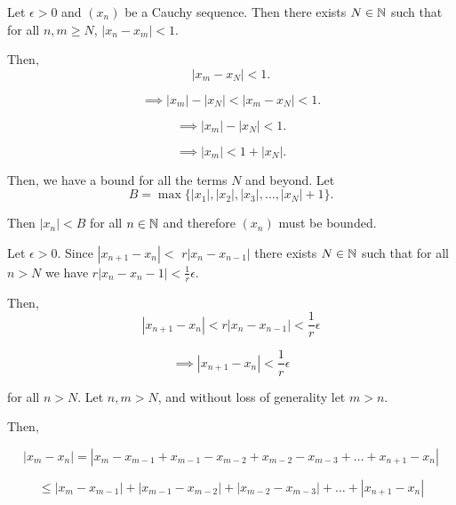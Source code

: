 \documentclass{report}
\begin{document}
\bigskip
{}

\bigskip
\bigskip
{}

Let $\epsilon >0$ and $(x_n)$ be a Cauchy sequence. Then there exists $N \in \NN$ such that for all $n,m \geq N$, $\left| x_n - x_m\right| < 1.$ 

Then, 
 $$ \left|x_m - x_N\right| < 1.$$

$$ \implies \left| x_m \right| - \left|x_N\right| < \left| x_m - x_N\right| < 1.$$


$$ \implies \left| x_m \right| - \left|x_N\right|  < 1.$$

$$ \implies \left| x_m \right| < 1 + \left|x_N\right|.$$


Then, we have a bound for all the terms $N$ and beyond. Let $$ B = \max\{|x_1|, |x_2|, |x_3|, \dots, |x_N| + 1\}.$$

Then $|x_n| < B$ for all $n \in \NN$ and therefore $(x_n)$ must be bounded.

\bigskip


Let $\epsilon >0.$ Since $\left|x_{n+1}-x_n\right|<$ $r\left|x_n-x_{n-1}\right|$ there exists $N \in \NN$ such that for all $n> N$ we have $r|x_n - x_n-1| < \frac{1}{r}\epsilon.$

Then, $$\left|x_{n+1}-x_n\right|< r\left|x_n-x_{n-1}\right| < \frac{1}{r}\epsilon$$

$$\implies \left|x_{n+1}-x_n\right|< \frac{1}{r}\epsilon$$

for all $n > N.$ Let $n,m>N$, and without loss of generality let $m >n.$ 

Then,

$$|x_m - x_n|= |x_m - x_{m-1} + x_{m-1} - x_{m-2}  + x_{m-2} - x_{m-3}+ \dots+ x_{n+1} -  x_{n}| $$

$$\leq |x_m - x_{m-1}| + |x_{m-1} - x_{m-2}|  + 
|x_{m-2} -  x_{m-3}| + \dots + | x_{n+1} -  x_{n}| $$
\end{document}
